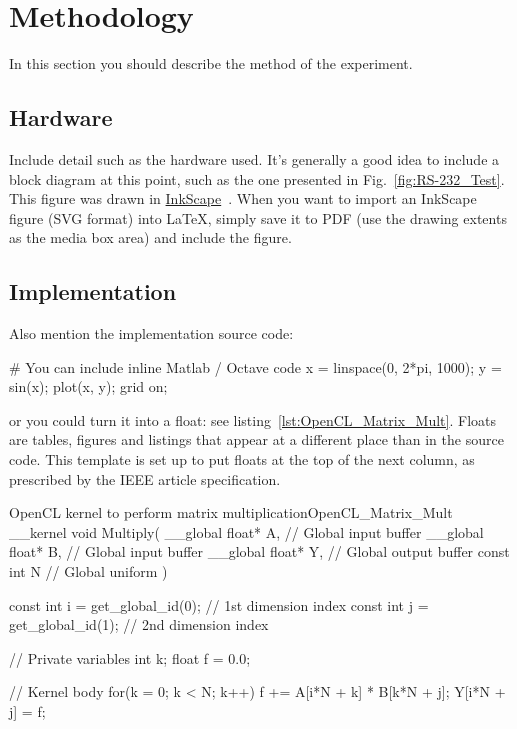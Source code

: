\section{Methodology}

In this section you should describe the method of the experiment.

\subsection{Hardware}
Include detail such as the hardware used.  It's generally a good idea to include a block diagram at this point, such as the one presented in Fig.~\ref{fig:RS-232_Test}.  This figure was drawn in \href{http://www.inkscape.org/}{InkScape}~\cite{InkScape}.  When you want to import an InkScape figure (SVG format) into \LaTeX{}, simply save it to PDF (use the drawing extents as the media box area) and include the figure.


\subsection{Implementation}
Also mention the implementation source code:

\begin{Matlab}
  # You can include inline Matlab / Octave code
  x = linspace(0, 2*pi, 1000);
  y = sin(x);
  plot(x, y); grid on;
\end{Matlab}

or you could turn it into a float: see listing~\ref{lst:OpenCL_Matrix_Mult}.  Floats are tables, figures and listings that appear at a different place than in the source code.  This template is set up to put floats at the top of the next column, as prescribed by the IEEE article specification.

\begin{OpenCL_float}{OpenCL kernel to perform matrix multiplication}{OpenCL_Matrix_Mult}
  __kernel void Multiply(
    __global float* A, // Global input buffer
    __global float* B, // Global input buffer
    __global float* Y, // Global output buffer
      const  int    N  // Global uniform
  ){
    const int i = get_global_id(0); // 1st dimension index
    const int j = get_global_id(1); // 2nd dimension index
   
    // Private variables
    int   k;
    float f = 0.0;
   
    // Kernel body
    for(k = 0; k < N; k++) f += A[i*N + k] * B[k*N + j];
    Y[i*N + j] = f;
  }
\end{OpenCL_float}

